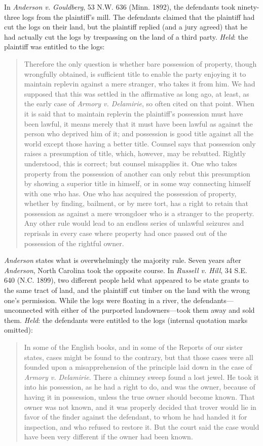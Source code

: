 In \textit{Anderson v. Gouldberg}, 53 N.W. 636 (Minn. 1892), the defendants took
ninety-three logs from the plaintiff's mill. The defendants claimed that the
plaintiff had cut the logs on their land, but the plaintiff replied (and a jury
agreed) that he had actually cut the logs by trespassing on the land of a third
party. \textit{Held}: the plaintiff was entitled to the logs:
\begin{quote}
Therefore the only question is whether bare possession of property, though
wrongfully obtained, is sufficient title to enable the party enjoying it to
maintain replevin against a mere stranger, who takes it from him. We had
supposed that this was settled in the affirmative as long ago, at least, as the
early case of \textit{Armory v. Delamirie}, so often cited on that point. When
it is said that to maintain replevin the plaintiff's possession must have been
lawful, it means merely that it must have been lawful as against the person who
deprived him of it; and possession is good title against all the world except
those having a better title. Counsel says that possession only raises a
presumption of title, which, however, may be rebutted. Rightly understood, this
is correct; but counsel misapplies it. One who takes property from the
possession of another can only rebut this presumption by showing a superior
title in himself, or in some way connecting himself with one who has. One who
has acquired the possession of property, whether by finding, bailment, or by
mere tort, has a right to retain that possession as against a mere wrongdoer
who is a stranger to the property. Any other rule would lead to an endless
series of unlawful seizures and reprisals in every case where property had once
passed out of the possession of the rightful owner.
\end{quote}
\textit{Anderson} states what is overwhelmingly the majority rule. Seven years
after \textit{Anderson}, North Carolina took the opposite course. In
\textit{Russell v. Hill}, 34 S.E. 640 (N.C. 1899), two different people held
what appeared to be state grants to the same tract of land, and the plaintiff
cut timber on the land with the wrong one's permission. While the logs were
floating in a river, the defendants---unconnected with either of the purported
landowners---took them away and sold them. \textit{Held}: the defendants were
entitled to the logs (internal quotation marks omitted):
\begin{quote}
In some of the English books, and in some of the Reports of our sister states,
cases might be found to the contrary, but that those cases were all founded
upon a misapprehension of the principle laid down in the case of \textit{Armory
v. Delamirie}. There a chimney sweep found a lost jewel. He took it into his
possession, as he had a right to do, and was the owner, because of having it in
possession, unless the true owner should become known. That owner was not
known, and it was properly decided that trover would lie in favor of the finder
against the defendant, to whom he had handed it for inspection, and who refused
to restore it. But the court said the case would have been very different if
the owner had been known.
\end{quote}
